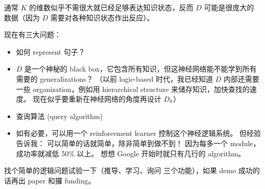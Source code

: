 \documentclass[12pt]{article}
\begin{document}
通常 $K$ 的维数似乎不需很大就已经足够表达知识状态，反而 $D$ 可能是很庞大的数据（因为 $D$ 需要对各种知识状态作出反应）。

现在有三大问题：
\begin{itemize}
\item 如何 represent 句子？
\item $D$ 是一个神秘的 black box，它包含所有知识，但这神经网络能不能学到所有需要的 generalizations？ （以前 logic-based 时代，我已经知道 $D$ 内部还需要一些 organization，例如用 hierarchical structure 来储存知识，加快查找的速度。 现在似乎要重新在神经网络的角度再设计 $D$。）
\item 查询算法 (query algorithm)
\item 如有必要，可以用一个 reinforcement learner 控制这个神经逻辑系统。 但经验告诉我： 可以简单的话就简单，除非简单到做不到！  因为每多一个 module，成功率就减低 50\% 以上。 想想 Google 开始时就只有几行的 algorithm。 
\end{itemize}

找个简单的逻辑问题试验一下（推导、学习、询问 三个功能），如果 demo 成功的话再出 paper 和攞 funding。 

\end{document}
